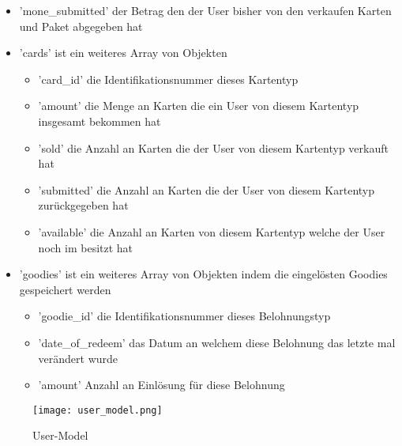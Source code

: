 \begin{itemize}
\begin{itemize}
						\item 'mone\_submitted' der Betrag den der User bisher von den verkaufen Karten und Paket abgegeben hat
						\item 'cards' ist ein weiteres Array von Objekten
						\begin{itemize}
							\item 'card\_id' die Identifikationsnummer dieses Kartentyp
							\item 'amount' die Menge an Karten die ein User von diesem Kartentyp insgesamt bekommen hat
							\item 'sold' die Anzahl an Karten die der User von diesem Kartentyp verkauft hat
							\item 'submitted' die Anzahl an Karten die der User von diesem Kartentyp zurückgegeben hat
							\item 'available' die Anzahl an Karten von diesem Kartentyp welche der User noch im besitzt hat
						\end{itemize}
						\item 'goodies' ist ein weiteres Array von Objekten indem die eingelösten Goodies gespeichert werden
						\begin{itemize}
							\item 'goodie\_id' die Identifikationsnummer dieses Belohnungstyp
							\item 'date\_of\_redeem' das Datum an welchem diese Belohnung das letzte mal verändert wurde
							\item 'amount' Anzahl an Einlösung für diese Belohnung
						\end{itemize}
					\end{itemize}
				\end{itemize}

			\begin{figure}[H]
				\centering
				\texttt{[image: user\_model.png]}
				\caption{User-Model}
			\end{figure}
		
		\newpage
